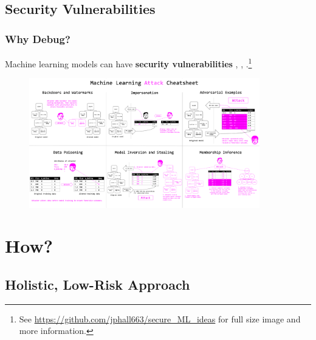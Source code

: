 \documentclass[11pt,
               aspectratio=43,
               hyperref={colorlinks}
               ]{beamer}
\begin{document}
		\subsection{Security Vulnerabilities}
			\begin{frame}
		
				\frametitle{Why Debug?}
		
				\footnotesize{Machine learning models can have \textbf{security vulnerabilities} \cite{security_of_ml}, \cite{membership_inference}, \cite{model_stealing}}.\footnote{\tiny{See \url{https://github.com/jphall663/secure_ML_ideas} for full size image and more information.}}
				\begin{figure}
					\begin{center}
						\includegraphics[height=160pt]{img/cheatsheet.png}
					\end{center}
				\end{figure}	
				\vspace{-17pt}
				\normalsize
		
			\end{frame}

	\section{How?}

		\subsection{Holistic, Low-Risk Approach}
	
\end{document}
